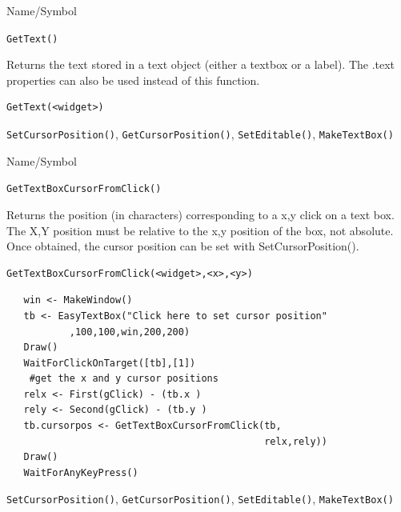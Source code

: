 \begin{desc}{Name/Symbol}
\item[Name/Symbol]	\verb+GetText()+

\item[Description]	Returns the text stored in a text object 
		(either a textbox or a label).  The .text properties can also
  be used instead of this function.

\item[Usage]
\begin{verbatim}
GetText(<widget>)
\end{verbatim}

\item[Example]	

\item[See Also]	\verb+SetCursorPosition()+, \verb+GetCursorPosition()+, \verb+SetEditable()+, \verb+MakeTextBox()+
\end{desc}

\begin{desc}{Name/Symbol}
\item[Name/Symbol]	\verb+GetTextBoxCursorFromClick()+

\item[Description]	Returns the position (in characters) corresponding to a x,y click on a text box.  The X,Y position must be relative to the x,y position of the box, not absolute.  Once obtained, the cursor position can be set with SetCursorPosition().

\item[Usage]
\begin{verbatim}
GetTextBoxCursorFromClick(<widget>,<x>,<y>)
\end{verbatim}

\item[Example]	
\small
\begin{verbatim}
   win <- MakeWindow()
   tb <- EasyTextBox("Click here to set cursor position"
           ,100,100,win,200,200)
   Draw()
   WaitForClickOnTarget([tb],[1])
    #get the x and y cursor positions
   relx <- First(gClick) - (tb.x )
   rely <- Second(gClick) - (tb.y )
   tb.cursorpos <- GetTextBoxCursorFromClick(tb,
                                             relx,rely))
   Draw()
   WaitForAnyKeyPress()
\end{verbatim}
\normalsize
\item[See Also]	\verb+SetCursorPosition()+, \verb+GetCursorPosition()+, \verb+SetEditable()+, \verb+MakeTextBox()+
\end{desc}



